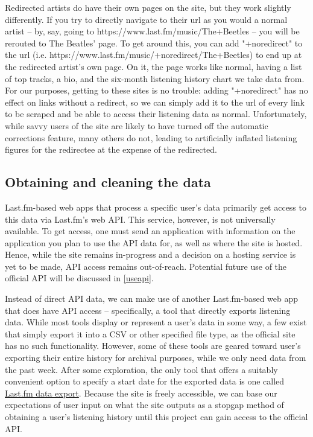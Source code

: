 Redirected artists do have their own pages on the site, but they work slightly differently. If you try to directly navigate to their url as you would a normal artist -- by, say, going to https://www.last.fm/music/The+Beetles -- you will be rerouted to The Beatles' page. To get around this, you can add "+noredirect" to the url (i.e. https://www.last.fm/music/+noredirect/The+Beetles) to end up at the redirected artist's own page. On it, the page works like normal, having a list of top tracks, a bio, and the six-month listening history chart we take data from. For our purposes, getting to these sites is no trouble: adding "+noredirect" has no effect on links without a redirect, so we can simply add it to the url of every link to be scraped and be able to access their listening data as normal. Unfortunately, while savvy users of the site are likely to have turned off the automatic corrections feature, many others do not, leading to artificially inflated listening figures for the redirectee at the expense of the redirected.

\subsection{Obtaining and cleaning the data}

Last.fm-based web apps that process a specific user's data primarily get access to this data via Last.fm's web API. This service, however, is not universally available. To get access, one must send an application with information on the application you plan to use the API data for, as well as where the site is hosted. Hence, while the site remains in-progress and a decision on a hosting service is yet to be made, API access remains out-of-reach. Potential future use of the official API will be discussed in \autoref{useapi}.

Instead of direct API data, we can make use of another Last.fm-based web app that does have API access -- specifically, a tool that directly exports listening data. While most tools display or represent a user's data in some way, a few exist that simply export it into a CSV or other specified file type, as the official site has no such functionality. However, some of these tools are geared toward user's exporting their entire history for archival purposes, while we only need data from the past week. After some exploration, the only tool that offers a suitably convenient option to specify a start date for the exported data is one called \href{https://mainstream.ghan.nl/export.html}{Last.fm data export}. Because the site is freely accessible, we can base our expectations of user input on what the site outputs as a stopgap method of obtaining a user's listening history until this project can gain access to the official API.

